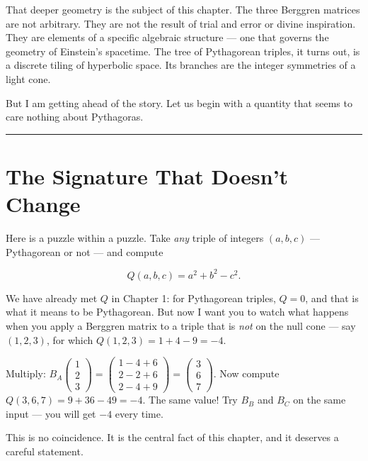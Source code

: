 \documentclass[11pt,openany]{book}
\theoremstyle{definition}
\theoremstyle{plain}
\theoremstyle{remark}
\begin{document}
That deeper geometry is the subject of this chapter. The three Berggren matrices are not arbitrary. They are not the result of trial and error or divine inspiration. They are elements of a specific algebraic structure — one that governs the geometry of Einstein's spacetime. The tree of Pythagorean triples, it turns out, is a discrete tiling of hyperbolic space. Its branches are the integer symmetries of a light cone.

But I am getting ahead of the story. Let us begin with a quantity that seems to care nothing about Pythagoras.

\bigskip\noindent\rule{\textwidth}{0.4pt}\bigskip


\section*{The Signature That Doesn't Change}


Here is a puzzle within a puzzle. Take \textit{any} triple of integers $(a, b, c)$ — Pythagorean or not — and compute

$$Q(a, b, c) = a^2 + b^2 - c^2.$$

We have already met $Q$ in Chapter 1: for Pythagorean triples, $Q = 0$, and that is what it means to be Pythagorean. But now I want you to watch what happens when you apply a Berggren matrix to a triple that is \textit{not} on the null cone — say $(1, 2, 3)$, for which $Q(1, 2, 3) = 1 + 4 - 9 = -4$.

Multiply: $B_A \begin{pmatrix} 1 \\ 2 \\ 3 \end{pmatrix} = \begin{pmatrix} 1 - 4 + 6 \\ 2 - 2 + 6 \\ 2 - 4 + 9 \end{pmatrix} = \begin{pmatrix} 3 \\ 6 \\ 7 \end{pmatrix}.$ Now compute $Q(3, 6, 7) = 9 + 36 - 49 = -4.$ The same value! Try $B_B$ and $B_C$ on the same input — you will get $-4$ every time.

This is no coincidence. It is the central fact of this chapter, and it deserves a careful statement.
\end{document}
